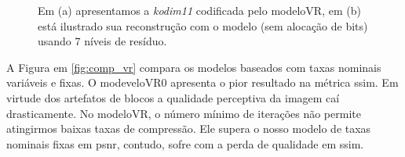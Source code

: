 \begin{figure}[]
	\newline
	\caption[Surgimento de artefatos de blocos no método alocação de bits usando o modeloVR]{Em (a) apresentamos a \textit{kodim11} codificada pelo modeloVR, em (b) está ilustrado sua reconstrução com o modelo (sem alocação de bits) usando 7 níveis de resíduo.}
	\label{fig:artefatos2}
\end{figure}

A Figura em \ref{fig:comp_vr} compara os modelos baseados com taxas nominais variáveis e fixas. O modeveloVR0 apresenta o pior resultado na métrica \acrshort{ssim}. Em virtude dos artefatos de blocos a qualidade perceptiva da imagem caí drasticamente. No modeloVR, o número mínimo de iterações não permite atingirmos baixas taxas de compressão. Ele supera o nosso modelo de taxas nominais fixas em \acrshort{psnr}, contudo, sofre com a perda de qualidade em \acrshort{ssim}.      

